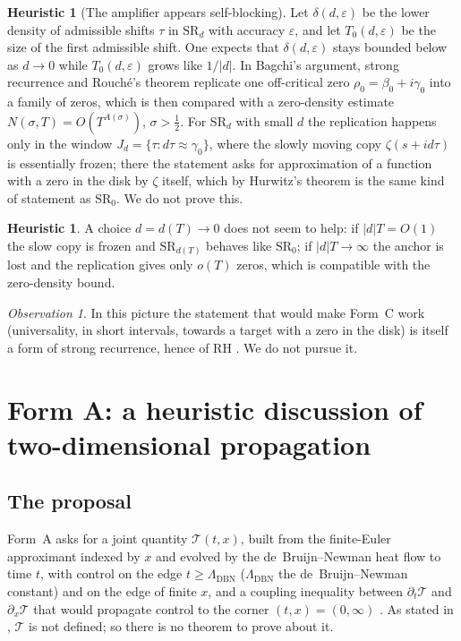\documentclass[11pt]{amsart}
\theoremstyle{definition}
\newtheorem{heuristic}[theorem]{Heuristic}
\theoremstyle{remark}
\newtheorem{observation}[theorem]{Observation}
\newcommand{\LDBN}{\Lambda_{\mathrm{DBN}}}
\begin{document}
\begin{heuristic}[The amplifier appears self-blocking]\label{thm:formC-selfblock}
Let $\delta(d,\varepsilon)$ be the lower density of admissible shifts $\tau$ in
$\mathrm{SR}_d$ with accuracy $\varepsilon$, and let $T_0(d,\varepsilon)$ be the size of the
first admissible shift. One expects that $\delta(d,\varepsilon)$ stays bounded below as $d\to0$
while $T_0(d,\varepsilon)$ grows like $1/|d|$. In Bagchi's argument, strong recurrence and
Rouch\'e's theorem replicate one off-critical zero $\rho_0=\beta_0+i\gamma_0$ into a family of
zeros, which is then compared with a zero-density estimate $N(\sigma,T)=O(T^{A(\sigma)})$,
$\sigma>\tfrac12$. For $\mathrm{SR}_d$ with small $d$ the replication happens only in the window
$J_d=\{\tau:d\tau\approx\gamma_0\}$, where the slowly moving copy $\zeta(s+id\tau)$ is essentially
frozen; there the statement asks for approximation of a function with a zero in the disk by
$\zeta$ itself, which by Hurwitz's theorem is the same kind of statement as $\mathrm{SR}_0$.
We do not prove this.
\end{heuristic}

\begin{heuristic}\label{cor:mobile}
A choice $d=d(T)\to0$ does not seem to help: if $|d|T=O(1)$ the slow copy is frozen and
$\mathrm{SR}_{d(T)}$ behaves like $\mathrm{SR}_0$; if $|d|T\to\infty$ the anchor is lost and the
replication gives only $o(T)$ zeros, which is compatible with the zero-density bound.
\end{heuristic}

\begin{observation}
In this picture the statement that would make Form~C work (universality, in short intervals,
towards a target with a zero in the disk) is itself a form of strong recurrence, hence of RH
\cite{Bagchi}. We do not pursue it.
\end{observation}

\section{Form A: a heuristic discussion of two-dimensional propagation}\label{sec:formA}

\subsection{The proposal}
Form~A \cite[\S6]{P27} asks for a joint quantity $\mathcal{T}(t,x)$, built from the
finite-Euler approximant indexed by $x$ and evolved by the de~Bruijn--Newman heat flow to time
$t$, with control on the edge $t\ge\LDBN$ ($\LDBN$ the de~Bruijn--Newman constant) and on the
edge of finite $x$, and a coupling inequality between $\partial_t\mathcal{T}$ and
$\partial_x\mathcal{T}$ that would propagate control to the corner $(t,x)=(0,\infty)$
\cite[Problem~6.1]{P27}. As stated in \cite{P27}, $\mathcal{T}$ is not defined; so there is no
theorem to prove about it.
\end{document}

